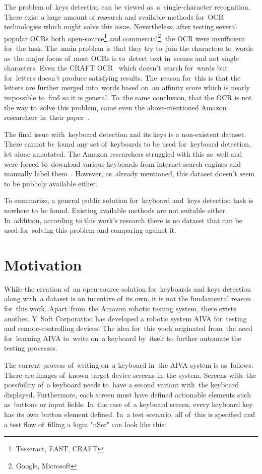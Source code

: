 The problem of~keys detection can be viewed as~a~single-character recognition. There exist a huge amount of research and available methods for~OCR technologies which might solve this issue. Nevertheless, after testing several popular OCRs both open-source\footnote[1]{Tesseract, EAST, CRAFT} and commercial\footnote[2]{Google, Microsoft}, the OCR were insufficient for~the task. The~main problem is that they try to~join the characters to~words as~the major focus of~most OCRs is to~detect text in~scenes and not single characters. Even the CRAFT OCR~\cite{craft-paper} which doesn't search for~words but for~letters doesn't produce satisfying results. The~reason for~this is that the letters are further merged into~words based on~an affinity score which is nearly impossible to~find so it is general. To~the same conclusion, that the OCR is not the way to~solve this problem, came even the above-mentioned Amazon researchers in~their paper~\cite{amazon-paper}.

The final issue with~keyboard detection and its keys is a non-existent dataset. There cannot be found any set of~keyboards to be used for~keyboard detection, let alone \mbox{annotated}. The Amazon researchers struggled with this as~well and were forced to~download \mbox{various} keyboards from internet search engines and manually label them~\cite{amazon-paper}. However, as~\mbox{already} mentioned, this dataset doesn't seem to be publicly available either.

To summarize, a general public solution for~keyboard and~keys detection task is nowhere to be found. Existing available methods are not suitable either. In~addition, according to this work's research there is no dataset that can be used for~solving this problem and comparing against it.

\section{Motivation}
\label{introduction-motivation}
While the creation of~an open-source solution for~keyboards and keys detection along with~a dataset is an incentive of its own, it is not the fundamental reason for~this work. Apart~from~the Amazon robotic testing system, there exists another. Y~Soft Corporation has developed a robotic system AIVA for~testing and remote-controlling devices. The idea for~this work originated from~the need for~learning AIVA to~write on~a keyboard by~itself to~further automate the testing processes.

The current process of~writing on~a keyboard in~the AIVA system is as~follows. There are images of~known target device screens in~the system. Screens with~the possibility of~a keyboard needs to~have a second variant with~the keyboard displayed. Furthermore, each screen must have defined actionable elements such as~buttons or input fields. In~the case of~a keyboard screen, every keyboard key has its own button element defined. In~a test scenario, all of~this is specified and a test flow of~filling a login "uSer" can look like this:

